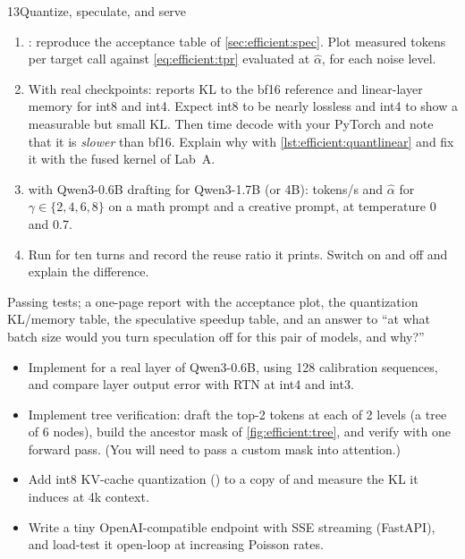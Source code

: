 \begin{labbox}{13}{Quantize, speculate, and serve}
\begin{enumerate}
  \item {}: reproduce the acceptance table of
        \cref{sec:efficient:spec}. Plot measured tokens per target call against
        \cref{eq:efficient:tpr} evaluated at $\hat\alpha$, for each noise level.
  \item With real checkpoints:  reports KL to the bf16 reference and
        linear-layer memory for int8 and int4. Expect int8 to be nearly lossless and int4 to
        show a measurable but small KL. Then time decode with your PyTorch
         and note that it is \emph{slower} than bf16. Explain why
        with \cref{lst:efficient:quantlinear} and fix it with the fused kernel of Lab~A.
  \item {} with Qwen3-0.6B drafting for Qwen3-1.7B (or 4B): tokens/s and
        $\hat\alpha$ for $\gamma\in\{2,4,6,8\}$ on a math prompt and a creative prompt, at
        temperature 0 and 0.7.
  \item Run  for ten turns and record the reuse ratio it prints.
        Switch  on and off and explain the difference.
\end{enumerate}

Passing tests; a one-page report with the acceptance plot, the quantization KL/memory
table, the speculative speedup table, and an answer to ``at what batch size would you
turn speculation off for this pair of models, and why?''

\begin{itemize}
  \item Implement  for a real layer of Qwen3-0.6B, using 128
        calibration sequences, and compare layer output error with RTN at int4 and int3.
  \item Implement tree verification: draft the top-2 tokens at each of 2 levels (a tree of
        6 nodes), build the ancestor mask of \cref{fig:efficient:tree}, and verify with one
        forward pass. (You will need to pass a custom mask into attention.)
  \item Add int8 KV-cache quantization () to a copy of
         and measure the KL it induces at 4k context.
  \item Write a tiny OpenAI-compatible  endpoint with SSE
        streaming (FastAPI), and load-test it open-loop at increasing Poisson rates.
\end{itemize}
\end{labbox}
